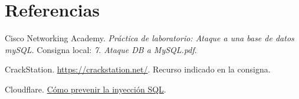 \documentclass[12pt,a4paper]{article}
\begin{document}
\newpage
\section{Referencias}
Cisco Networking Academy. \textit{Práctica de laboratorio: Ataque a una base de datos mySQL}. Consigna local: \textit{7. Ataque DB a MySQL.pdf}.
\par CrackStation. \url{https://crackstation.net/}. Recurso indicado en la consigna.
\par Cloudflare. \href{https://www.cloudflare.com/es-es/learning/security/threats/how-to-prevent-sql-injection/}{Cómo prevenir la inyección SQL}.
\end{document}
